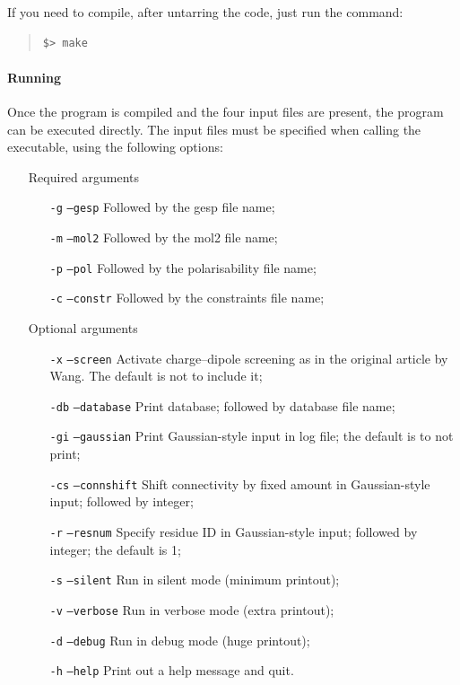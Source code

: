 \documentclass[a4paper]{report}
\begin{document}
If you need to compile, after untarring the code, just run the command:
\begin{framed}
\begin{quote}
\begin{verbatim}
$> make
\end{verbatim}
\end{quote}
\end{framed}

\paragraph*{Running}

Once the program is compiled and the four input files are present, the program can
be executed directly. The input files must be specified when calling the executable,
using the following options:
\begin{itemize}
  \item[Required arguments]
    \begin{itemize}
      \item[\texttt{-g}] \texttt{--gesp} Followed by the gesp file name;
      \item[\texttt{-m}] \texttt{--mol2} Followed by the mol2 file name;
      \item[\texttt{-p}] \texttt{--pol} Followed by the polarisability file name;
      \item[\texttt{-c}] \texttt{--constr} Followed by the constraints file name;
    \end{itemize}
  \item[Optional arguments]
    \begin{itemize}
      \item[\texttt{-x}] \texttt{--screen} Activate charge--dipole screening as in the original article by Wang. The default is not to include it;
      \item[\texttt{-db}] \texttt{--database} Print database; followed by database file name;
      \item[\texttt{-gi}] \texttt{--gaussian} Print Gaussian-style input in log file; the default is to not print;
      \item[\texttt{-cs}] \texttt{--connshift} Shift connectivity by fixed amount in Gaussian-style input; followed by integer; 
      \item[\texttt{-r}] \texttt{--resnum} Specify residue ID in Gaussian-style input; followed by integer; the default is 1;
      \item[\texttt{-s}] \texttt{--silent} Run in silent mode (minimum printout);
      \item[\texttt{-v}] \texttt{--verbose} Run in verbose mode (extra printout);
      \item[\texttt{-d}] \texttt{--debug} Run in debug mode (huge printout);
      \item[\texttt{-h}] \texttt{--help} Print out a help message and quit.
    \end{itemize}
\end{itemize}
\end{document}
